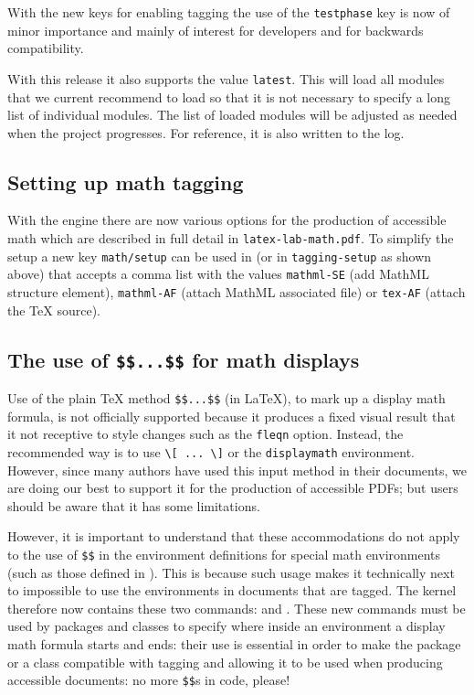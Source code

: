 \documentclass{ltnews}
\providecommand\env[1]{\texttt{#1}}
\providecommand\LuaTeX{\hologo{LuaTeX}}
\providecommand\env[1]{\texttt{#1}}
\begin{document}
With the new keys for enabling tagging the use of the
\texttt{testphase} key is now of minor importance and mainly of
interest for developers and for backwards compatibility.

With this release it also supports the value \texttt{latest}.  This
will load all modules that we current recommend to load so that it is not necessary to
specify a long list of individual modules. The list of loaded modules
will be adjusted as needed when the project progresses. For reference,
it is also written to the log.



\subsection{Setting up math tagging}

With the \LuaTeX{} engine there are now various options for the
production of accessible math which are described in full detail in
\texttt{latex-lab-math.pdf}. To simplify the setup a new key
\texttt{math/setup} can be used in  (or in
\texttt{tagging-setup} as shown above) that accepts a comma list with
the values \texttt{mathml-SE} (add MathML structure element),
\texttt{mathml-AF} (attach MathML associated file) or \texttt{tex-AF}
(attach the \TeX{} source).


\subsection{The use of \texttt{\$\$...\$\$} for math displays}

Use of the plain \TeX{} method \verb=$$...$$= (in \LaTeX{}), to mark up a
display math formula, is not officially supported because it produces a
fixed visual result that it not receptive to style changes such as the
\texttt{fleqn} option. Instead, the recommended way is to use
\verb=\[ ... \]= or the \env{displaymath} environment. However, since many
authors %
have used this input method in their documents, we are doing our best to
support it for the production of accessible PDFs; but users should be
aware that it has some limitations.

However, it is important to understand that these accommodations do not apply 
to the use of \verb=$$= in the environment definitions for special
math environments (such as those defined in ). 
This is because such usage makes it
technically next to %
impossible to use the environments in documents that are tagged.
%
The kernel therefore now contains these two commands:
 and .  These new commands
must be used by packages and classes to specify where
inside an environment
a display math
formula starts and ends: their use is essential in order to make the
package or a class compatible with tagging and allowing it to be used
when producing accessible documents: no more \texttt{\$\$}s
in code, please! 
\end{document}
